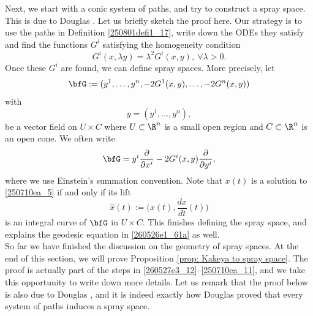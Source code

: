 \documentclass{article}
\numberwithin{equation}{section}
\theoremstyle{plain}
\begin{document}
Next, we start with a conic system of paths, and try to construct a spray space. This is due to Douglas \cite{Dou27}.  Let us briefly sketch the proof here. Our strategy is to use the paths in Definition \ref{250801defi1_17}, write down the ODEs they satisfy and find the functions $G^i$ satisfying the homogeneity condition 
\begin{equation}\label{260527e3_12}
    G^i(x,\lambda y) = \lambda^2 G^i(x,y), \ \forall \lambda>0.
\end{equation}
Once these $G^i$ are found, we can define spray spaces. More precisely, let 
\begin{equation}
\bfG:=(
y^1, \dots, y^n, -2G^1(x, y), \dots, -2G^n(x, y)
)
\end{equation}
with 
\begin{equation}
y=(y^1, \dots, y^n),
\end{equation}
be a vector field on $U\times C$ where $U\subset \R^n$ is a small open region and $C\subset \R^n$ is an open cone. We often write 
\begin{equation}\label{250710ea_11}
\bfG= 
y^i \frac{\partial}{\partial x^i}- 2 G^i(x, y) \frac{\partial}{\partial y^i},
\end{equation}
where we use Einstein's summation convention. Note that $x(t)$ is a solution to \eqref{250710ea_5} if and only if its lift 
\begin{equation}
\widehat{x}(t):= \Big(x(t), \frac{dx}{dt}(t)\Big)
\end{equation}
is an integral curve of $\bfG$ in $U\times C$. This finishes defining the spray space, and explains the geodesic equation in \eqref{260526e1_61a} as well. \\






So far we have finished the discussion on the geometry of spray spaces. At the end of this section, we will prove Proposition \ref{prop: Kakeya to spray space}. The proof is actually part of the steps in \eqref{260527e3_12}--\eqref{250710ea_11}, and we take this opportunity to write down more details. Let us remark that the proof below is also due to Douglas \cite{Dou27}, and it is indeed exactly how Douglas \cite{Dou27} proved that every system of paths induces a spray space.  
\end{document}
